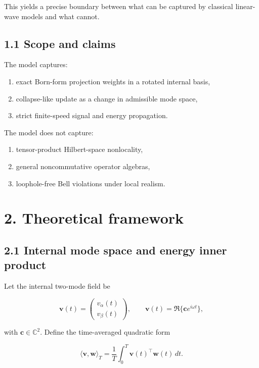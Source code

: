 \documentclass[
  letterpaper,
  DIV=11,
  numbers=noendperiod]{scrartcl}
\providecommand{\tightlist}{%
  \setlength{\itemsep}{0pt}\setlength{\parskip}{0pt}}
\begin{document}
This yields a precise boundary between what can be captured by classical
linear-wave models and what cannot.

\subsection{1.1 Scope and claims}\label{scope-and-claims}

The model captures:

\begin{enumerate}
\def\labelenumi{\arabic{enumi}.}
\tightlist
\item
  exact Born-form projection weights in a rotated internal basis,
\item
  collapse-like update as a change in admissible mode space,
\item
  strict finite-speed signal and energy propagation.
\end{enumerate}

The model does not capture:

\begin{enumerate}
\def\labelenumi{\arabic{enumi}.}
\tightlist
\item
  tensor-product Hilbert-space nonlocality,
\item
  general noncommutative operator algebras,
\item
  loophole-free Bell violations under local realism.
\end{enumerate}

\section{2. Theoretical framework}\label{theoretical-framework}

\subsection{2.1 Internal mode space and energy inner
product}\label{internal-mode-space-and-energy-inner-product}

Let the internal two-mode field be

\[
\mathbf v(t)=\begin{pmatrix}v_\alpha(t)\\ v_\beta(t)\end{pmatrix},
\qquad
\mathbf v(t)=\Re\{\mathbf c e^{i\omega t}\},
\]

with \(\mathbf c\in\mathbb C^2\). Define the time-averaged quadratic
form

\[
\langle \mathbf v,\mathbf w\rangle_T=\frac1T\int_0^T \mathbf v(t)^\top\mathbf w(t)\,dt.
\]
\end{document}
